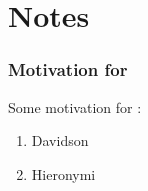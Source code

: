 \chapter{Notes}
\label{cha:notes}

\subsection{Motivation for \ESU{}}
\label{sec:motiv-main-prem}

Some motivation for \ESU{}:

\begin{enumerate}
\item Davidson
\item Hieronymi
\end{enumerate}

